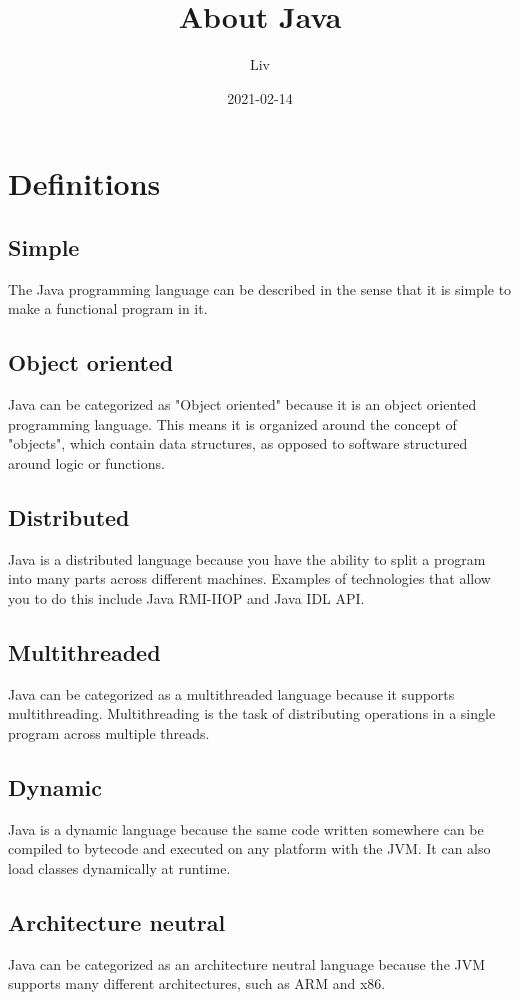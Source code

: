 \documentclass{article}
\title{About Java}
\date{2021-02-14}
\author{Liv}
\begin{document}
  \maketitle

  \section{Definitions}
  \subsection{Simple}
  The Java programming language can be described in the sense that it is simple to make a functional program in it.
  
  \subsection{Object oriented}
  Java can be categorized as "Object oriented" because it is an object oriented programming language.
  This means it is organized around the concept of "objects", which contain data structures, as opposed to software structured around logic or functions.

  \subsection{Distributed}
  Java is a distributed language because you have the ability to split a program into many parts across different machines.
  Examples of technologies that allow you to do this include Java RMI-IIOP and Java IDL API.

  \subsection{Multithreaded}
  Java can be categorized as a multithreaded language because it supports multithreading.
  Multithreading is the task of distributing operations in a single program across multiple threads.

  \subsection{Dynamic}
  Java is a dynamic language because the same code written somewhere can be compiled to bytecode and executed on any platform with the JVM.
  It can also load classes dynamically at runtime.

  \subsection{Architecture neutral}
  Java can be categorized as an architecture neutral language because the JVM supports many different architectures, such as ARM and x86.
  
\end{document}
